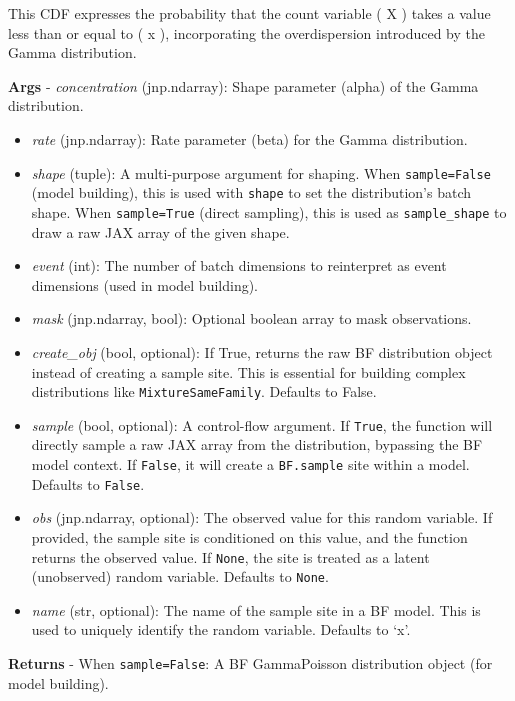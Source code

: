 \documentclass[
  letterpaper,
  DIV=11,
  numbers=noendperiod]{scrartcl}
\begin{document}
This CDF expresses the probability that the count variable ( X ) takes a
value less than or equal to ( x ), incorporating the overdispersion
introduced by the Gamma distribution.

\textbf{Args} - \emph{concentration} (jnp.ndarray): Shape parameter
(alpha) of the Gamma distribution.

\begin{itemize}
\item
  \emph{rate} (jnp.ndarray): Rate parameter (beta) for the Gamma
  distribution.
\item
  \emph{shape} (tuple): A multi-purpose argument for shaping. When
  \texttt{sample=False} (model building), this is used with
  \texttt{shape} to set the distribution's batch shape. When
  \texttt{sample=True} (direct sampling), this is used as
  \texttt{sample\_shape} to draw a raw JAX array of the given shape.
\item
  \emph{event} (int): The number of batch dimensions to reinterpret as
  event dimensions (used in model building).
\item
  \emph{mask} (jnp.ndarray, bool): Optional boolean array to mask
  observations.
\item
  \emph{create\_obj} (bool, optional): If True, returns the raw BF
  distribution object instead of creating a sample site. This is
  essential for building complex distributions like
  \texttt{MixtureSameFamily}. Defaults to False.
\item
  \emph{sample} (bool, optional): A control-flow argument. If
  \texttt{True}, the function will directly sample a raw JAX array from
  the distribution, bypassing the BF model context. If \texttt{False},
  it will create a \texttt{BF.sample} site within a model. Defaults to
  \texttt{False}.
\item
  \emph{obs} (jnp.ndarray, optional): The observed value for this random
  variable. If provided, the sample site is conditioned on this value,
  and the function returns the observed value. If \texttt{None}, the
  site is treated as a latent (unobserved) random variable. Defaults to
  \texttt{None}.
\item
  \emph{name} (str, optional): The name of the sample site in a BF
  model. This is used to uniquely identify the random variable. Defaults
  to `x'.
\end{itemize}

\textbf{Returns} - When \texttt{sample=False}: A BF GammaPoisson
distribution object (for model building).
\end{document}
